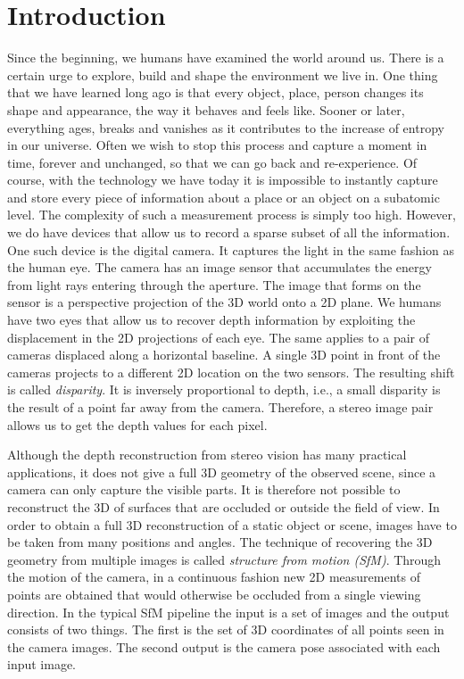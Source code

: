 \chapter{Introduction}
	
	Since the beginning, we humans have examined the world around us. 
	There is a certain urge to explore, build and shape the environment we live in.
	One thing that we have learned long ago is that every object, place, person changes its shape and appearance, the way it behaves and feels like. Sooner or later, everything ages, breaks and vanishes as it contributes to the increase of entropy in our universe.
	Often we wish to stop this process and capture a moment in time, forever and unchanged, so that we can go back and re-experience.
	Of course, with the technology we have today it is impossible to instantly capture and store every piece of information about a place or an object on a subatomic level.
	The complexity of such a measurement process is simply too high.
	However, we do have devices that allow us to record a sparse subset of all the information.
	One such device is the digital camera.
	It captures the light in the same fashion as the human eye.
	The camera has an image sensor that accumulates the energy from light rays entering through the aperture.
	The image that forms on the sensor is a perspective projection of the 3D world onto a 2D plane.
	We humans have two eyes that allow us to recover depth information by exploiting the displacement in the 2D projections of each eye.
	The same applies to a pair of cameras displaced along a horizontal baseline.
	A single 3D point in front of the cameras projects to a different 2D location on the two sensors.
	The resulting shift is called \emph{disparity}.
	It is inversely proportional to depth, i.e., a small disparity is the result of a point far away from the camera.
	Therefore, a stereo image pair allows us to get the depth values for each pixel.
	
	Although the depth reconstruction from stereo vision has many practical applications, it does not give a full 3D geometry of the observed scene, since a camera can only capture the visible parts.
	It is therefore not possible to reconstruct the 3D of surfaces that are occluded or outside the field of view. 
	In order to obtain a full 3D reconstruction of a static object or scene, images have to be taken from many positions and angles.
	The technique of recovering the 3D geometry from multiple images is called \emph{structure from motion (SfM)}.
	Through the motion of the camera, in a continuous fashion new 2D measurements of points are obtained that would otherwise be occluded from a single viewing direction.
	In the typical SfM pipeline the input is a set of images and the output consists of two things.
	The first is the set of 3D coordinates of all points seen in the camera images.
	The second output is the camera pose associated with each input image.
	
